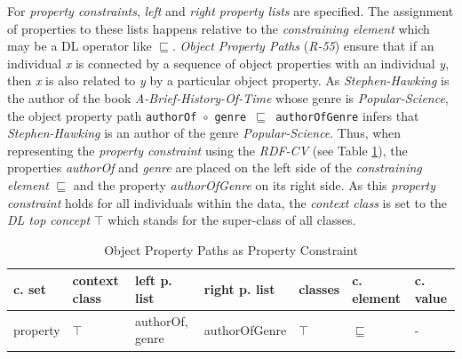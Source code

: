 \documentclass[a4paper,fontsize=11pt]{scrartcl}
\newcommand{\ms}[1]{\texttt{#1}}
\begin{document}
For \emph{property constraints}, \emph{left} and \emph{right property lists} are specified.
The assignment of properties to these lists happens relative to the \emph{constraining element} 
which may be a DL operator like $\sqsubseteq$.
\emph{Object Property Paths} (\emph{R-55})
ensure that if an individual \emph{x} is connected by a sequence of object properties with an individual \emph{y}, 
then \emph{x} is also related to \emph{y} by a particular object property. 
As \emph{Stephen-Hawking} is the author of the book \emph{A-Brief-History-Of-Time} 
whose genre is \emph{Popular-Science}, 
the object property path {\small\ms{authorOf $\circ$ genre $\sqsubseteq$ authorOfGenre}} infers that \emph{Stephen-Hawking} is an author of the genre \emph{Popular-Science}. 
Thus, when representing the \emph{property constraint} using the \emph{RDF-CV} (see Table \ref{tab:property-constraint-object-property-paths}), the properties \emph{authorOf} and \emph{genre} are placed on the left side of the \emph{constraining element} \emph{$\sqsubseteq$}
and the property \emph{authorOfGenre} on its right side.
As this \emph{property constraint} holds for all individuals within the data, the \emph{context class} is set to the \emph{DL top concept} $\top$ which stands for the super-class of all classes.
\begin{table}[H]
  \scriptsize
  \sffamily
  \vspace{0cm}
	\caption{Object Property Paths as Property Constraint}
	\label{tab:property-constraint-object-property-paths}
	\centering
		\begin{tabular}{l|l|l|l|l|l|l}
      \textbf{c. set} & \textbf{context class} & \textbf{left p. list} & \textbf{right p. list} & \textbf{classes} & \textbf{c. element} & \textbf{c. value} \\
      \hline
      property & $\top$ & authorOf, genre & authorOfGenre & $\top$ & $\sqsubseteq$ & - \\
		\end{tabular}
\end{table}
\end{document}
